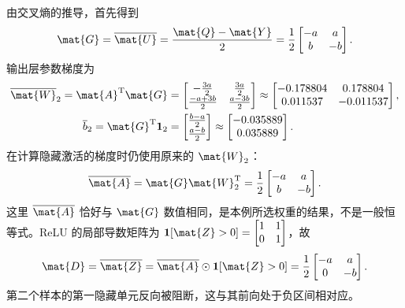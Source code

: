 \documentclass[../textbook.tex]{subfiles}
\begin{document}
\begin{example}
由交叉熵的推导，首先得到
\begin{equation*}
 \mat{G}=\overline{\mat{U}}=\frac{\mat{Q}-\mat{Y}}{2}
 =\frac12\begin{bmatrix}-a&a\\b&-b\end{bmatrix}.
\end{equation*}
输出层参数梯度为
\begin{align*}
 \overline{\mat{W}}_2=\mat{A}^{\mathrm{T}}\mat{G}
 &=\begin{bmatrix}-\frac{3a}{2}&\frac{3a}{2}\\\frac{-a+3b}{2}&\frac{a-3b}{2}\end{bmatrix}
 \approx\begin{bmatrix}-0.178804&0.178804\\0.011537&-0.011537\end{bmatrix},\\
 \overline b_2=\mat{G}^{\mathrm{T}}\mathbf1_2
 &=\begin{bmatrix}\frac{b-a}{2}\\\frac{a-b}{2}\end{bmatrix}
 \approx\begin{bmatrix}-0.035889\\0.035889\end{bmatrix}.
\end{align*}
在计算隐藏激活的梯度时仍使用原来的 $\mat{W}_2$：
\begin{equation*}
 \overline{\mat{A}}=\mat{G}\mat{W}_2^{\mathrm{T}}
 =\frac12\begin{bmatrix}-a&a\\b&-b\end{bmatrix}.
\end{equation*}
这里 $\overline{\mat{A}}$ 恰好与 $\mat{G}$ 数值相同，是本例所选权重的结果，不是一般恒等式。ReLU 的局部导数矩阵为
$\mathbf1[\mat{Z}>0]=\begin{bmatrix}1&1\\0&1\end{bmatrix}$，故
\begin{equation*}
 \mat{D}=\overline{\mat{Z}}=\overline{\mat{A}}\odot\mathbf1[\mat{Z}>0]
 =\frac12\begin{bmatrix}-a&a\\0&-b\end{bmatrix}.
\end{equation*}
第二个样本的第一隐藏单元反向被阻断，这与其前向处于负区间相对应。


\end{example}
\end{document}
